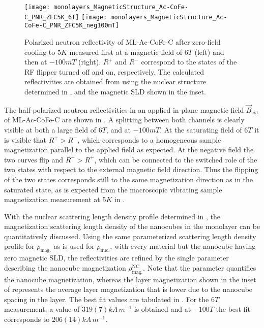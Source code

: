 \documentclass[\main/dresen_thesis.tex]{subfiles}
\begin{document}
  \begin{figure}[tb]
    \centering
    \texttt{[image: monolayers\_MagneticStructure\_Ac-CoFe-C\_PNR\_ZFC5K\_6T]}
    \texttt{[image: monolayers\_MagneticStructure\_Ac-CoFe-C\_PNR\_ZFC5K\_neg100mT]}
    \caption{\label{fig:monolayer:magneticStructure:pnr5K}Polarized neutron reflectivity of ML-Ac-CoFe-C after zero-field cooling to $5 \unit{K}$ measured first at a magnetic field of $6 \unit{T}$ (left) and then at $-100 \unit{mT}$ (right). $R^{+}$ and $R^{-}$ correspond to the states of the RF flipper turned off and on, respectively. The calculated reflectivities are obtained from using the nuclear structure determined in , and the magnetic SLD shown in the inset.}
  \end{figure}
  The half-polarized neutron reflectivities in an applied in-plane magnetic field $\vec{B}_\mathrm{ext.}$ of ML-Ac-CoFe-C are shown in .
  A splitting between both channels is clearly visible at both a large field of $6 \unit{T}$, and at $-100 \unit{mT}$.
  At the saturating field of $6 \unit{T}$ it is visible that $R^{+} > R^{-}$, which corresponds to a homogeneous sample magnetization parallel to the applied field as expected.
  At the negative field the two curves flip and $R^{-} > R^{+}$, which can be connected to the switched role of the two states with respect to the external magnetic field direction.
  Thus the flipping of the two states corresponds still to the same magnetization direction as in the saturated state, as is expected from the macroscopic vibrating sample magnetization measurement at $5 \unit{K}$ in .

  With the nuclear scattering length density profile determined in , the magnetization scattering length density of the nanocubes in the monolayer can be quantitatively discussed.
  Using the same parameterized scattering length density profile for $\rho_\mathrm{mag.}$ as is used for $\rho_\mathrm{nuc.}$, with every material but the nanocube having zero magnetic SLD, the reflectivities are refined by the single parameter describing the nanocube magnetization $\rho_\mathrm{mag.}^\mathrm{NC}$.
  Note that the parameter quantifies the nanocube magnetization, whereas the layer magnetization shown in the inset of  represents the average layer magnetization that is lower due to the nanocube spacing in the layer.
  The best fit values are tabulated in .
  For the $6 \unit{T}$ measurement, a value of $319(7) \unit{kA \, m^{-1}}$ is obtained and at $-100 \unit{T}$ the best fit corresponds to $206(14) \unit{kA \, m^{-1}}$.
\end{document}
